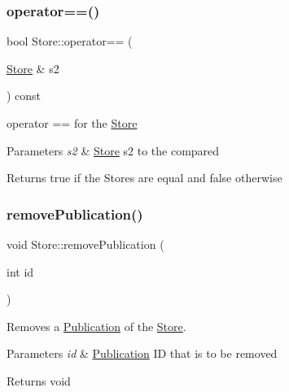 \subsubsection{\texorpdfstring{operator==()}{operator==()}}
{\footnotesize\ttfamily bool Store\+::operator== (\begin{DoxyParamCaption}\item[{\hyperlink{class_store}{Store} \&}]{s2 }\end{DoxyParamCaption}) const}



operator == for the \hyperlink{class_store}{Store} 


\begin{DoxyParams}{Parameters}
{\em s2} & \hyperlink{class_store}{Store} s2 to the compared\\
\hline
\end{DoxyParams}
\begin{DoxyReturn}{Returns}
true if the Stores are equal and false otherwise 
\end{DoxyReturn}
\mbox{\label{class_store_a64f322bc111e0e88ab0995cd86718f0d}} 
\subsubsection{\texorpdfstring{remove\+Publication()}{removePublication()}}
{\footnotesize\ttfamily void Store\+::remove\+Publication (\begin{DoxyParamCaption}\item[{int}]{id }\end{DoxyParamCaption})}



Removes a \hyperlink{class_publication}{Publication} of the \hyperlink{class_store}{Store}. 


\begin{DoxyParams}{Parameters}
{\em id} & \hyperlink{class_publication}{Publication} ID that is to be removed\\
\hline
\end{DoxyParams}
\begin{DoxyReturn}{Returns}
void 
\end{DoxyReturn}
\mbox{\label{class_store_a2d721f632d90947fae8c9eaa9f8abfcb}} 
